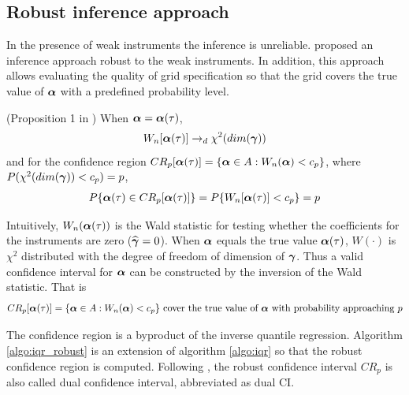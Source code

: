 \subsection{Robust inference approach} \label{sec:iqr_robust}
In the presence of weak instruments the inference is
unreliable. \cite{Chernozhukov2008} proposed an inference approach robust to the
weak instruments. In addition, this approach allows evaluating the quality of
grid specification so that the grid covers the true value of $\boldsymbol{\alpha}$ with a
predefined probability level. 

\begin{prop} \label{prop:robust} (Proposition 1 in \cite{Chernozhukov2008})
When $\boldsymbol{\alpha} =  \boldsymbol{\alpha}(\tau)$,
\begin{align*}
  W_n[\boldsymbol{\alpha}(\tau)] \rightarrow_d \chi^2(dim(\boldsymbol{\gamma}))
\end{align*}
and for the confidence region $CR_p[\boldsymbol{\alpha}(\tau)] = \{\boldsymbol{\alpha} \in A:
W_n(\boldsymbol{\alpha}) < c_p\}$, where $P(\chi^2(dim(\boldsymbol{\gamma})) < c_p) = p$,
\begin{align}
  P\{\boldsymbol{\alpha}(\tau) \in CR_p[\boldsymbol{\alpha}(\tau)]\} = P\{ W_n[\boldsymbol{\alpha}(\tau)] < c_p\} =
  p
\end{align}
\end{prop}

Intuitively, $W_n(\boldsymbol{\alpha}(\tau))$ is the Wald statistic for testing whether the
coefficients for the instruments are zero ($\widehat{\boldsymbol{\gamma}} = 0$). When $\boldsymbol{\alpha}$
equals the true value $\boldsymbol{\alpha}(\tau)$, $W(\cdot)$ is $\chi^2$
distributed with the degree of freedom of dimension of $\boldsymbol{\gamma}$. Thus a valid
confidence interval for $\boldsymbol{\alpha}$ can be constructed by the inversion of the
Wald statistic. That is 
$$
CR_p[\boldsymbol{\alpha}(\tau)] = \{\boldsymbol{\alpha} \in A: W_n(\boldsymbol{\alpha}) < c_p\}
\text{ cover the true value of $\boldsymbol{\alpha}$ with probability approaching
$p$}
$$

The confidence region is a byproduct of the inverse quantile regression.
Algorithm \ref{algo:iqr_robust} is an extension of algorithm \ref{algo:iqr} so
that the robust confidence region is computed. Following
\cite{Chernozhukov2008}, the robust confidence interval $CR_p$ is also called 
dual confidence interval, abbreviated as dual CI.

